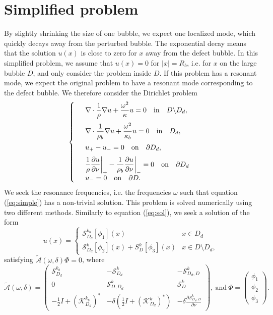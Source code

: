 \documentclass[a4paper]{article}
\theoremstyle{definition}
\newcommand{\A}{\mathcal{A}}
\renewcommand{\S}{\mathcal{S}}
\newcommand{\K}{\mathcal{K}}
\newcommand{\ds}{\displaystyle}
\newcommand{\eqnref}[1]{(\ref {#1})}
\def\nm{\noalign{\medskip}}
\begin{document}
\section{Simplified problem}
By slightly shrinking the size of one bubble, we expect one localized mode, which quickly decays away from the perturbed bubble. The exponential decay means that the solution $u(x)$ is close to zero for $x$ away from the defect bubble. In this simplified problem, we assume that $u(x)=0$ for $|x|=R_b$, i.e. for $x$ on the large bubble $D$, and only consider the problem inside $D$. If this problem has a resonant mode, we expect the original problem to have a resonant mode corresponding to the defect bubble. We therefore consider the Dirichlet problem
\begin{equation} \label{eq:simple}
\left\{
\begin{array} {ll}
&\ds \nabla \cdot \frac{1}{\rho} \nabla  u+ \frac{\omega^2}{\kappa} u  = 0 \quad \text{in} \quad D \backslash D_d, \\
\nm
&\ds \nabla \cdot \frac{1}{\rho_b} \nabla  u+ \frac{\omega^2}{\kappa_b} u  = 0 \quad \text{in} \quad D_d, \\
\nm
&\ds  u_{+} -u_{-}  =0   \quad \text{on} \quad \partial D_d, \\
\nm
& \ds  \frac{1}{\rho} \frac{\partial u}{\partial \nu} \bigg|_{+} - \frac{1}{\rho_b} \frac{\partial u}{\partial \nu} \bigg|_{-} =0 \quad \text{on} \quad \partial D_d \\
&\ds u_- = 0 \quad \text{on} \quad \partial D.
\end{array}
\right .
\end{equation}
We seek the resonance frequencies, i.e. the frequencies $\omega$ such that equation \eqnref{eq:simple} has a non-trivial solution. This problem is solved numerically using two different methods. Similarly to equation \eqnref{eq:sol}, we seek a solution of the form 
\begin{equation} \label{eq:simplesol}
u(x) = \begin{cases}
\S_{D_d}^{k_b}[\phi_1](x) \quad &x\in D_d \\
\S_{D_d}^{k}[\phi_2](x) + S_D^k[\phi_3](x) & x\in D\setminus D_d,
\end{cases}
\end{equation}
satisfying $\tilde{\A}(\omega, \delta)\Phi = 0$, where
\begin{equation} \label{eq:simpleA}
\tilde{\A}(\omega, \delta) = 
\begin{pmatrix}
\S_{D_d}^{k_b} &  -\S_{D_d}^{k} & -\S_{D_d,D}^{k} \\
0 & \S_{D,D_d}^k & \S_{D}^k \\
-\frac{1}{2}I+ (\K_{D_d}^{k_b})^*& -\delta\left( \frac{1}{2}I+ \left(\K_{D_d}^{k}\right)^*\right) & -\delta \frac{\partial \S_{D_d,D}^{k}}{\partial \nu}
\end{pmatrix}, 
\ \text{and}  \ \Phi= 
\begin{pmatrix}
\phi_1\\
\phi_2 \\
\phi_3
\end{pmatrix}.
\end{equation}
\end{document}
